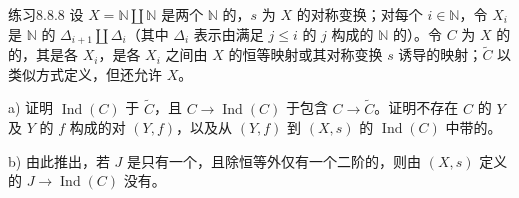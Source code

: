 \begin{SGAresult}{练习}{8.8.8}
设 $X=\mathbb N\amalg\mathbb N$ 是两个 $\mathbb N$ 的，$s$ 为 $X$ 的对称变换；对每个 $i\in\mathbb N$，令 $X_i$ 是 $\mathbb N$ 的 $\Delta_{i+1}\amalg\Delta_i$（其中 $\Delta_i$ 表示由满足 $j\leq i$ 的 $j$ 构成的 $\mathbb N$ 的）。令 $C$ 为 $X$ 的的，其是各 $X_i$，是各 $X_i$ 之间由 $X$ 的恒等映射或其对称变换 $s$ 诱导的映射；$\widetilde C$ 以类似方式定义，但还允许 $X$。

 a) 证明 $\operatorname{Ind}(C)$ 于 $\widetilde C$，且 $C\to\operatorname{Ind}(C)$ 于包含 $C\to\widetilde C$。证明不存在 $C$ 的 $Y$ 及 $Y$ 的 $f$ 构成的对 $(Y,f)$，以及从 $(Y,f)$ 到 $(X,s)$ 的 $\operatorname{Ind}(C)$ 中带的。

 b) 由此推出，若 $J$ 是只有一个，且除恒等外仅有一个二阶的，则由 $(X,s)$ 定义的 $J\to\operatorname{Ind}(C)$ 没有。
\end{SGAresult}

